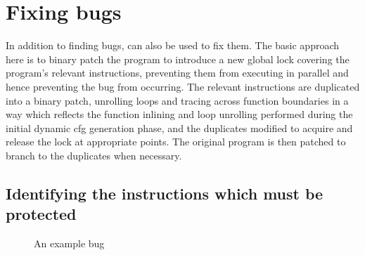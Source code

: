 \chapter{Fixing bugs}
\label{sect:fix_global_lock}

In addition to finding bugs, {\technique} can also be used to fix
them.  The basic approach here is to binary patch the program to
introduce a new global lock covering the program's relevant
instructions, preventing them from executing in parallel and hence
preventing the bug from occurring.  The relevant instructions are
duplicated into a binary patch, unrolling loops and tracing across
function boundaries in a way which reflects the function inlining and
loop unrolling performed during the initial dynamic \gls{cfg}
generation phase, and the duplicates modified to acquire and release
the lock at appropriate points.  The original program is then patched
to branch to the duplicates when necessary.

\section{Identifying the instructions which must be protected}

\begin{figure}
  \hspace{-5mm}
  \hspace{-10mm}
  \caption{An example bug}
  \label{fig:fix_bug:complex_local}
\end{figure}

